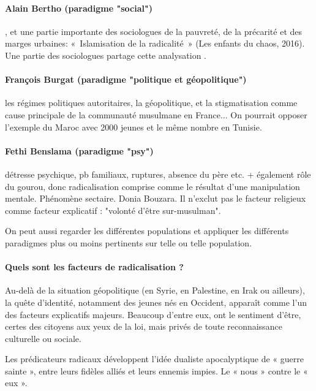 \paragraph{Alain Bertho (paradigme "social")}, et une partie importante des sociologues de la pauvreté, de la précarité et des marges urbaines: « Islamisation de la radicalité » (Les enfants du chaos, 2016). Une partie des sociologues partage cette analysation .

\paragraph{François Burgat (paradigme "politique et géopolitique")} les régimes politiques autoritaires, la géopolitique, et la stigmatisation comme cause principale de la communauté musulmane en France... On pourrait opposer l'exemple du Maroc avec 2000 jeunes et le même nombre en Tunisie. 

\paragraph{Fethi Benslama (paradigme "psy")}  détresse psychique, pb familiaux, ruptures, absence du père etc. + également rôle du gourou, donc radicalisation comprise comme le résultat d’une manipulation mentale. Phénomène sectaire. Donia Bouzara. Il n'exclut pas le facteur religieux comme facteur explicatif : "volonté d'être sur-musulman".

\begin{Synthesis}
On peut aussi regarder les différentes populations et appliquer les différents paradigmes plus ou moins pertinents sur telle ou telle population.
\end{Synthesis}


\paragraph{Quels sont les facteurs de radicalisation ?}


Au-delà de la situation {géopolitique (en Syrie, en Palestine, en
Irak ou ailleurs), la quête d'identité,} notamment des jeunes nés en
Occident, apparaît comme l'un des facteurs explicatifs majeurs. Beaucoup
d'entre eux, ont le sentiment d'être, certes des citoyens aux yeux de la
loi, mais privés de toute reconnaissance culturelle ou sociale.

Les prédicateurs radicaux développent l'idée dualiste apocalyptique de «
guerre sainte », entre leurs fidèles alliés et leurs ennemis impies.
{Le « nous » contre le} « eux ».


